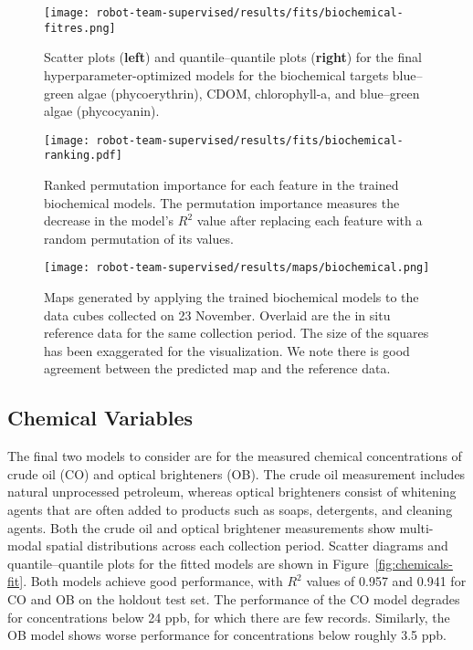 \newpage

\begin{figure}[H]
  \centering
  \texttt{[image: robot-team-supervised/results/fits/biochemical-fitres.png]}
  \caption{Scatter plots (\textbf{left}) and quantile--quantile plots
    (\textbf{right}) for the final hyperparameter-optimized models for the
    biochemical targets blue--green algae (phycoerythrin), CDOM, chlorophyll-a,
    and blue--green algae (phycocyanin). \label{fig:biochem-fit}}
\end{figure}

\begin{figure}[H]
  \centering
  \texttt{[image: robot-team-supervised/results/fits/biochemical-ranking.pdf]}
  \caption{Ranked permutation importance for each feature in the trained
    biochemical models. The permutation importance measures the decrease in the
    model's $R^2$ value after replacing each feature with a random permutation
    of its values.\label{fig:biochem-fi}}
\end{figure}

\begin{figure}[H]
  \centering
  \texttt{[image: robot-team-supervised/results/maps/biochemical.png]}
  \caption{Maps generated by applying the trained biochemical models to the data
  cubes collected on 23 November. Overlaid are the in situ reference data for
  the same collection period. The size of the squares has been exaggerated for
  the visualization. We note there is good agreement between the predicted map
  and the reference data. \label{fig:map-biochem}}
\end{figure}

\newpage

\subsection{Chemical Variables}

The final two models to consider are for the measured chemical concentrations of crude oil (CO) and optical brighteners (OB). The crude oil measurement includes natural unprocessed petroleum, whereas optical brighteners consist of whitening agents that are often added to products such as soaps, detergents, and cleaning agents. Both the crude oil and optical brightener measurements show multi-modal spatial distributions across each collection period. Scatter diagrams and quantile--quantile plots for the fitted models are shown in Figure~\ref{fig:chemicals-fit}. Both models achieve good performance, with $R^2$ values of 0.957 and 0.941 for CO and OB on the holdout test set. The performance of the CO model degrades for concentrations below 24 ppb, for which there are few records. Similarly, the OB model shows worse performance for concentrations below roughly 3.5 ppb.

